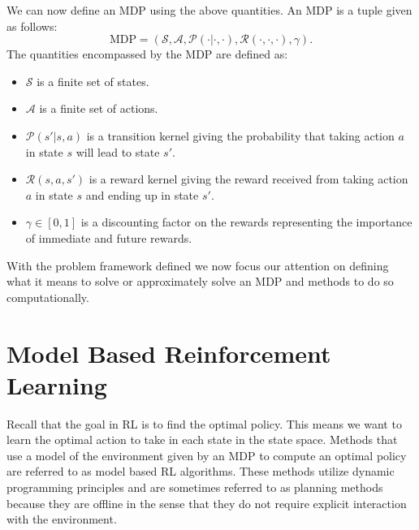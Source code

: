 \documentclass{article}
\newcommand{\mc}{\mathcal}
\begin{document}
We can now define an MDP using the above quantities. An MDP is a tuple given as follows:
\begin{equation}
\text{MDP} = (\mc{S}, \mc{A}, \mc{P}(\cdot|\cdot, \cdot), \mc{R}(\cdot, \cdot, \cdot), \gamma).
\end{equation}
The quantities encompassed by the MDP are defined as:
\begin{itemize}
\item $\mc{S}$ is a finite set of states.
\item $\mc{A}$ is a finite set of actions.
\item $\mc{P}(s'|s, a)$ is a transition kernel giving the probability that taking action $a$ in state $s$ will lead to state $s'$.
\item $\mc{R}(s, a, s')$ is a reward kernel giving the reward received from taking action $a$ in state $s$ and ending up in state $s'$.
\item $\gamma \in [0, 1]$ is a discounting factor on the rewards representing the importance of immediate and future rewards.
\end{itemize}
With the problem framework defined we now focus our attention on defining what it means to solve or approximately solve an MDP and methods to do so computationally.

\section{Model Based Reinforcement Learning}\label{sec:model_based}
Recall that the goal in RL is to find the optimal policy. This means we want to learn the optimal action to take in each state in the state space. Methods that use a model of the environment given by an MDP to compute an optimal policy are referred to as model based RL algorithms. These methods utilize dynamic programming principles and are sometimes referred to as planning methods because they are offline in the sense that they do not require explicit interaction with the environment.
\end{document}
